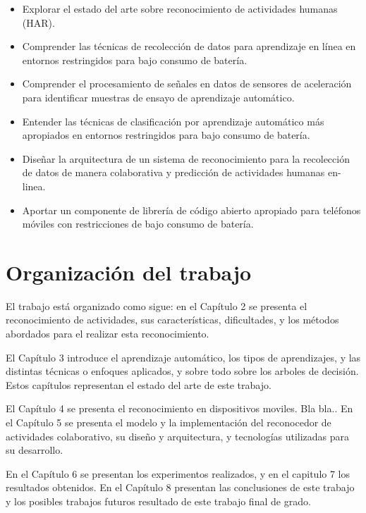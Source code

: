 \begin{itemize}

\item Explorar el estado del arte sobre reconocimiento de actividades humanas (HAR).

\item Comprender las técnicas de recolección de datos para aprendizaje en línea en entornos restringidos para bajo consumo de batería.

\item Comprender el procesamiento de señales en datos de sensores de aceleración para identificar muestras de ensayo de aprendizaje automático.

\item Entender las técnicas de clasificación por aprendizaje automático más apropiados en entornos restringidos para bajo consumo de batería.

\item Diseñar la arquitectura de un sistema de reconocimiento para la recolección de datos de manera colaborativa y predicción de actividades humanas en-linea.

\item Aportar un componente de librería de código abierto apropiado para teléfonos móviles con restricciones de bajo consumo de batería.


\end{itemize}

\section{Organización del trabajo}
El trabajo está organizado como sigue: en el Capítulo 2 se presenta el reconocimiento de actividades, sus características, dificultades, y los métodos abordados para el realizar esta reconocimiento.

El Capítulo 3 introduce el aprendizaje automático, los tipos de aprendizajes, y las distintas técnicas o enfoques aplicados, y sobre todo sobre los arboles de decisión. Estos capítulos representan el estado del arte de este trabajo.

El Capítulo 4 se presenta el reconocimiento en dispositivos moviles. Bla bla..
En el Capítulo 5 se presenta el modelo y la implementación del reconocedor de actividades colaborativo, su diseño y arquitectura, y tecnologías utilizadas para su desarrollo.

En el Capítulo 6 se presentan los experimentos realizados, y en el capitulo 7 los resultados obtenidos. En el Capítulo 8 presentan las conclusiones de este trabajo y los posibles trabajos futuros resultado de este trabajo final de grado.
